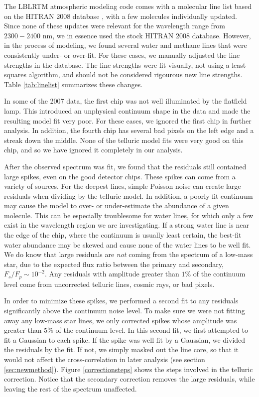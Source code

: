 \documentclass[11pt]{report}     %
\begin{document}
The LBLRTM atmospheric modeling code comes with a molecular line list
based on the HITRAN 2008 database \citep{Rothman2009}, with a few
molecules individually updated. Since none of these updates were
relevant for the wavelength range from $2300 - 2400$ nm, we in
essence used the stock HITRAN 2008 database. However,
in the process of modeling, we found several water and methane lines
that were consistently under- or over-fit. For these cases, we
manually adjusted the line strengths in the database. The line
strengths were fit visually, not using a least-squares algorithm, and
should not be considered rigourous new line strengths. Table \ref{tab:linelist}
summarizes these changes.



In some of the 2007 data, the first chip was not well illuminated
by the flatfield lamp. This introduced an unphysical continuum shape
in the data and made the resulting model fit very poor. For these
cases, we ignored the first chip in further analysis. In addition,
the fourth chip has several bad pixels on the left edge and a streak
down the middle. None of the telluric model fits were very good on
this chip, and so we have ignored it completely in our analysis.

After the observed spectrum was fit, we found that the residuals still
contained large spikes, even on the good detector chips. These spikes
can come from a variety of sources. For the deepest lines, simple
Poisson noise can create large residuals when dividing by the telluric
model. In addition, a poorly fit continuum may cause the model to over- or under-estimate
the abundance of a given molecule. This can be especially troublesome
for water lines, for which only a few exist in the wavelength region we
are investigating. If a strong water line is near the edge of the
chip, where the continuum is usually least certain, the best-fit water
abundance may be skewed and cause none of the water lines to be well fit. We do know
that large residuals are \emph{not} coming from the spectrum of a
low-mass star, due to the expected flux ratio between the primary and
secondary, $F_s/F_p \sim10^{-2}$. Any residuals with amplitude greater than 
$1\%$ of the continuum level come from uncorrected telluric lines,
cosmic rays, or bad pixels. 

In order to minimize these spikes, we performed a second fit to any
residuals significantly above the continuum noise level. To make sure
we were not fitting away any low-mass star lines, we only corrected
spikes whose amplitude was greater than $5\%$ of the continuum level. In this
second fit, we first attempted to fit a Gaussian to each spike. If the
spike was well fit by a Gaussian, we divided the residuals by the fit.
If not, we
simply masked out the line core, so that it would not affect the
cross-correlation in later analysis (see section \ref{sec:newmethod}). Figure
\ref{correctionsteps} shows the steps involved in the telluric
correction. Notice that the secondary correction removes the
large residuals, while leaving the rest of the spectrum
unaffected. 
\end{document}
